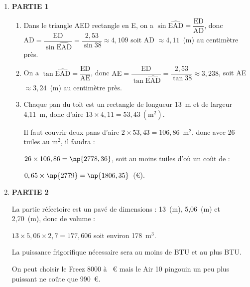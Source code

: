 
\medskip

\begin{enumerate}
\item \textbf{PARTIE 1}
	\begin{enumerate}
		\item Dans le triangle AED rectangle en E, on a $\sin \widehat{\text{EAD}} = \dfrac{\text{ED}}{\text{AD}}$, donc $\text{AD} = \dfrac{\text{ED}}{\sin \widehat{\text{EAD}}} = \dfrac{2,53}{\sin 38} \approx 4,109$ soit AD $\approx 4,11$~(m) au centimètre près.
		\item On a $\tan \widehat{\text{EAD}} = \dfrac{\text{ED}}{\text{AE}}$, donc $\text{AE} = \dfrac{\text{ED}}{\tan \widehat{\text{EAD}}} = \dfrac{2,53}{\tan 38} \approx 3,238$, soit AE $ \approx 3,24$~(m) au centimètre près.
		\item Chaque pan du toit est un rectangle de longueur 13~m et de largeur 4,11~m, donc d'aire $13 \times 4,11 = 53,43~\left(\text{m}^2\right)$.
		
Il faut couvrir deux pans d'aire $2 \times 53,43 = 106,86$~m$^2$, donc avec 26 tuiles au m$^2$, il faudra :

$26 \times 106,86 = \np{2778,36}$, soit au moins  tuiles d'où un coût de :

$0,65 \times \np{2779} = \np{1806,35}$~(\euro).
	\end{enumerate}

\medskip

\item \textbf{PARTIE 2}

La partie réfectoire est un pavé de dimensions : 13~(m), 5,06~(m) et 2,70~(m), donc de volume :

$13 \times 5,06 \times 2,7 = 177,606$ soit environ 178~m$^3$.

La puissance frigorifique nécessaire sera au moins de  BTU et au plus  BTU.

On peut choisir le Freez 8000 à ~\euro{} mais le Air 10 pingouin un peu plus puissant ne coûte que 990~\euro.
\end{enumerate}

\bigskip

